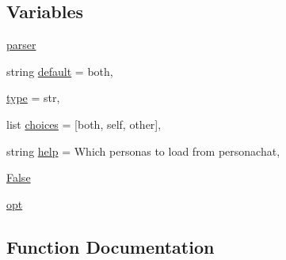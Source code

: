 \subsection*{Variables}
\begin{DoxyCompactItemize}
\item 
\hyperlink{namespaceparlai_1_1mturk_1_1tasks_1_1personachat_1_1personachat__chat_1_1extract__and__save__personas_aaa127ce985dc18ee3a5524edb87abc56}{parser}
\item 
string \hyperlink{namespaceparlai_1_1mturk_1_1tasks_1_1personachat_1_1personachat__chat_1_1extract__and__save__personas_aca44d9fb7857f6ef1e2a6eea9913b88c}{default} = \textquotesingle{}both\textquotesingle{},
\item 
\hyperlink{namespaceparlai_1_1mturk_1_1tasks_1_1personachat_1_1personachat__chat_1_1extract__and__save__personas_a9f4e1c30b2d1611ab4158001925e5cf7}{type} = str,
\item 
list \hyperlink{namespaceparlai_1_1mturk_1_1tasks_1_1personachat_1_1personachat__chat_1_1extract__and__save__personas_a71338ed717c1e7ba7c54bfff02589e4e}{choices} = \mbox{[}\textquotesingle{}both\textquotesingle{}, \textquotesingle{}self\textquotesingle{}, \textquotesingle{}other\textquotesingle{}\mbox{]},
\item 
string \hyperlink{namespaceparlai_1_1mturk_1_1tasks_1_1personachat_1_1personachat__chat_1_1extract__and__save__personas_a0bb02874abe7194828166a1bd1b4a342}{help} = \textquotesingle{}Which personas to load from personachat\textquotesingle{},
\item 
\hyperlink{namespaceparlai_1_1mturk_1_1tasks_1_1personachat_1_1personachat__chat_1_1extract__and__save__personas_a09f827e9b1fb80665edee523230502f3}{False}
\item 
\hyperlink{namespaceparlai_1_1mturk_1_1tasks_1_1personachat_1_1personachat__chat_1_1extract__and__save__personas_a4956ea1d7db767343948d06c207e3f14}{opt}
\end{DoxyCompactItemize}


\subsection{Function Documentation}
\mbox{\label{namespaceparlai_1_1mturk_1_1tasks_1_1personachat_1_1personachat__chat_1_1extract__and__save__personas_ad456be8590e65dece8a4b1e57aacef65}} 
